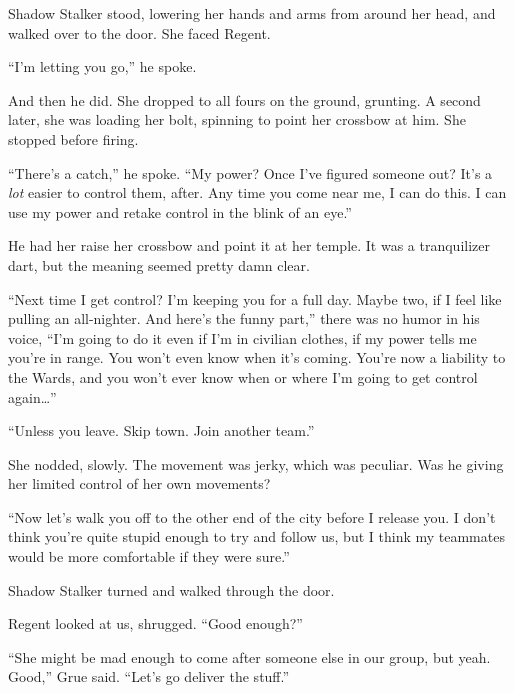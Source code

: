 Shadow Stalker stood, lowering her hands and arms from around her head, and walked over to the door.  She faced Regent.



``I'm letting you go,'' he spoke.



And then he did.  She dropped to all fours on the ground, grunting.  A second later, she was loading her bolt, spinning to point her crossbow at him.  She stopped before firing.



``There's a catch,'' he spoke. ``My power?  Once I've figured someone out?  It's a \emph{lot} easier to control them, after.  Any time you come near me, I can do this.  I can use my power and retake control in the blink of an eye.''



He had her raise her crossbow and point it at her temple.  It was a tranquilizer dart, but the meaning seemed pretty damn clear.



``Next time I get control?  I'm keeping you for a full day.  Maybe two, if I feel like pulling an all-nighter.  And here's the funny part,'' there was no humor in his voice, ``I'm going to do it even if I'm in civilian clothes, if my power tells me you're in range.  You won't even know when it's coming.  You're now a liability to the Wards, and you won't ever know when or where I'm going to get control again\ldots''



``Unless you leave.  Skip town.  Join another team.''



She nodded, slowly.  The movement was jerky, which was peculiar.  Was he giving her limited control of her own movements?



``Now let's walk you off to the other end of the city before I release you.  I don't think you're quite stupid enough to try and follow us, but I think my teammates would be more comfortable if they were sure.''



Shadow Stalker turned and walked through the door.



Regent looked at us, shrugged.  ``Good enough?''



``She might be mad enough to come after someone else in our group, but yeah.  Good,'' Grue said.  ``Let's go deliver the stuff.''



